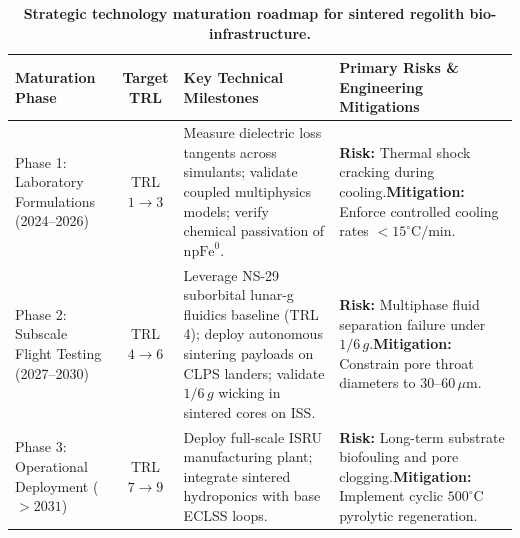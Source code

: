 \begin{table}[t!]
\small
\centering
\caption{\textbf{Strategic technology maturation roadmap for sintered regolith bio-infrastructure.}}
\label{tab:trl_roadmap}
\begin{tabularx}{\textwidth}{lcXX}
\toprule
\textbf{Maturation Phase} & \textbf{Target TRL} & \textbf{Key Technical Milestones} & \textbf{Primary Risks \& Engineering Mitigations} \\
\midrule
Phase 1: Laboratory Formulations (2024--2026) & TRL $1 \to 3$ & Measure dielectric loss tangents across simulants; validate coupled multiphysics models; verify chemical passivation of $\mathrm{npFe}^0$\cite{ming1989lunar,xi2026multiphysics,ramossomolinos2024electromagnetic}. & \textbf{Risk:} Thermal shock cracking during cooling.\newline \textbf{Mitigation:} Enforce controlled cooling rates $<15^\circ\mathrm{C/min}$\cite{xi2026multiphysics}. \\
\addlinespace
Phase 2: Subscale Flight Testing (2027--2030) & TRL $4 \to 6$ & Leverage NS-29 suborbital lunar-g fluidics baseline (TRL 4)\cite{hasenstein2026assessing}; deploy autonomous sintering payloads on CLPS landers; validate $1/6\,g$ wicking in sintered cores on ISS\cite{ming1989lunar,fateri2019solar,heinse2007porous,hasenstein2026assessing}. & \textbf{Risk:} Multiphase fluid separation failure under $1/6\,g$.\newline \textbf{Mitigation:} Constrain pore throat diameters to $30\text{--}60\,\mu\mathrm{m}$\cite{ming1989lunar}. \\
\addlinespace
Phase 3: Operational Deployment ($>2031$) & TRL $7 \to 9$ & Deploy full-scale ISRU manufacturing plant; integrate sintered hydroponics with base ECLSS loops\cite{ming1989lunar,chinnannan2025spirulina,metzger2023cost}. & \textbf{Risk:} Long-term substrate biofouling and pore clogging.\newline \textbf{Mitigation:} Implement cyclic $500^\circ\mathrm{C}$ pyrolytic regeneration\cite{ming1989lunar,santomartino2023toward}. \\
\bottomrule
\end{tabularx}
\end{table}
